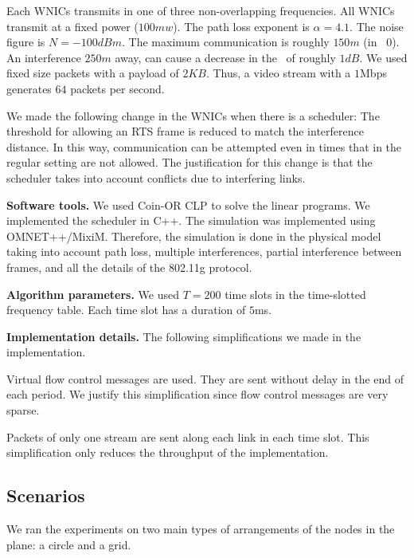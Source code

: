 \documentclass[12pt]{article}
\newenvironment{proof sketch}[1]{\noindent {\emph{Proof sketch of #1:}}}{\hfill \qed}
\newcommand{\SINR}{\text{\sc{sinr}}}
\newcommand{\MCS}{\text{\sc{mcs}}}
\begin{document}
 Each WNICs transmits in one of three
non-overlapping frequencies.  All WNICs transmit at a fixed power
($100mw$). The path loss exponent is $\alpha=4.1$. The noise figure
is $N=-100dBm$. The maximum communication is roughly $150m$ (in \MCS\
$0$). An interference $250m$ away, can cause a decrease in the \SINR\
of roughly $1dB$. We used fixed size packets with a payload of $2KB$.
Thus, a video stream with a $1$Mbps generates $64$ packets per second.

We made the following change in the WNICs when there is a scheduler:
The threshold for allowing an RTS frame is reduced to match the
interference distance. In this way, communication can be attempted
even in times that in the regular setting are not allowed. The
justification for this change is that the scheduler takes into account
conflicts due to interfering links.

\noindent\textbf{Software tools.}  We used Coin-OR CLP to solve the linear
programs.  We implemented the scheduler in C++.  The simulation was
implemented using OMNET++/MixiM. Therefore, the simulation is done in
the physical model taking into account path loss, multiple
interferences, partial interference between frames, and all the
details of the 802.11g protocol.

\noindent\textbf{Algorithm parameters.} We used $T=200$ time slots in the
time-slotted frequency table.  Each time slot has a duration of $5$ms.

\noindent\textbf{Implementation details.}
The following simplifications we made in the implementation.
\begin{inparaenum}[(1)]
\item Virtual flow control messages are used. They are sent without
  delay in the end of each period. We justify this simplification
  since flow control messages are very sparse.
\item Packets of only one stream are sent along each link in each time slot.
This simplification only reduces the throughput of the implementation.
\end{inparaenum}

\subsection{Scenarios}
We ran the experiments on two main types of arrangements of the nodes
in the plane: a circle and a grid.
\end{document}
